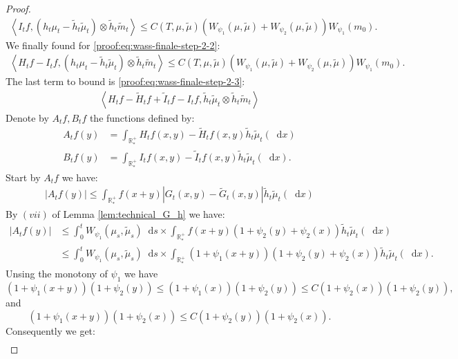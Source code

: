 \documentclass[11pt,a4paper]{article}
\newcommand{\RRP}{\mathbb{R}^+_*}
\newcommand{\brac}[1]{\left\langle#1\right\rangle}
\newcommand{\dd}{\mathop{}\!\mathrm{d}}
\begin{document}
\begin{proof}
\begin{align*}
        \brac{I_tf,\left(h_t\mu_t - \tilde{h}_t\tilde{\mu}_t\right)\otimes \tilde{h}_t\tilde{m}_t}  \leq C(T,\mu,\tilde{\mu})\left(W_{\psi_1}\left( \mu , \tilde{\mu}\right) + W_{\psi_2}\left( \mu , \tilde{\mu}\right)\right)W_{\psi_1}\left(m_0\right).
    \end{align*}
    We finally found for \eqref{proof:eq:wass-finale-step-2-2}:
    \begin{align*}
        \brac{H_tf - I_tf,\left(h_t\mu_t - \tilde{h}_t\tilde{\mu}_t\right)\otimes \tilde{h}_t\tilde{m}_t}  \leq C(T,\mu,\tilde{\mu})\left(W_{\psi_1}\left( \mu , \tilde{\mu}\right) + W_{\psi_2}\left( \mu , \tilde{\mu}\right)\right)W_{\psi_1}\left(m_0\right).
    \end{align*}
    The last term to bound is \eqref{proof:eq:wass-finale-step-2-3}:
    \begin{align*}
        \brac{H_tf-\tilde{H}_tf + \tilde{I}_tf - I_tf,\tilde{h}_t\tilde{\mu}_t\otimes \tilde{h}_t\tilde{m}_t}
    \end{align*}
    Denote by $A_tf, B_tf$ the functions defined by:
    \begin{align*}
        A_tf(y) &= \int_{\RRP} H_tf(x,y)-\tilde{H}_tf(x,y)  \tilde{h}_t\tilde{\mu}_t(\dd x) \\
        B_tf(y) &= \int_{\RRP} I_tf(x,y)-\tilde{I}_tf(x,y)  \tilde{h}_t\tilde{\mu}_t(\dd x).
    \end{align*}
    Start by $A_tf$ we have:
    \begin{align*}
        \left|A_tf(y)\right| \leq \int_{\RRP} f(x+y) \left|G_t(x,y) - \tilde{G}_t(x,y) \right| \tilde{h}_t\tilde{\mu}_t(\dd x)
    \end{align*}
    By $(vii)$ of Lemma \ref{lem:technical_G_h} we have:
    \begin{align*}
        \left|A_tf(y)\right| 
        &\leq \int_0^t W_{\psi_1}(\mu_s,\tilde{\mu}_s) \dd s \times \int_{\RRP} f(x+y)\left(1 + \psi_2(y) + \psi_2(x) \right) \tilde{h}_t\tilde{\mu}_t(\dd x) \\
        &\leq \int_0^t W_{\psi_1}(\mu_s,\tilde{\mu}_s) \dd s \times \int_{\RRP} (1 + \psi_1(x+y))\left(1 + \psi_2(y) + \psi_2(x) \right) \tilde{h}_t\tilde{\mu}_t(\dd x).
    \end{align*}
    Unsing the monotony of $\psi_1$ we have 
    \[(1 + \psi_1(x+y) )(1 +\psi_2(y)) \leq (1 + \psi_1(x) )(1 + \psi_2(y)) \leq C(1 + \psi_2(x))(1 + \psi_2(y)),
    \]
    and
    \[(1 + \psi_1(x+y) )(1 +\psi_2(x)) \leq C(1 + \psi_2(y))(1 + \psi_2(x)).
    \]
    Consequently we get:
    \begin{align*}

\end{align*}
\end{proof}
\end{document}
